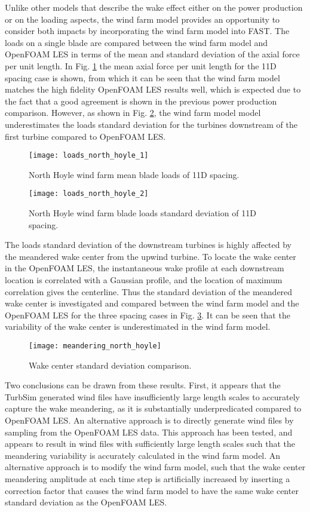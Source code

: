 \documentclass{umthesis}
\begin{document}
Unlike other models that describe the wake effect either on the power production or on the loading aspects, the wind farm model provides an opportunity to consider both impacts by incorporating the wind farm model into FAST. The loads on a single blade are compared between the wind farm model and OpenFOAM LES in terms of the mean and standard deviation of the axial force per unit length. In Fig. \ref{fig:loads_north_hoyle_1} the mean axial force per unit length for the 11D spacing case is shown, from which it can be seen that the wind farm model matches the high fidelity OpenFOAM LES results well, which is expected due to the fact that a good agreement is shown in the previous power production comparison. However, as shown in Fig. \ref{fig:loads_north_hoyle_2}, the wind farm model model underestimates the loads standard deviation for the turbines downstream of the first turbine compared to OpenFOAM LES.
\begin{figure}
  \centering
  \texttt{[image: loads\_north\_hoyle\_1]}
  \caption{North Hoyle wind farm mean blade loads of 11D spacing.}\label{fig:loads_north_hoyle_1}
\end{figure}

\begin{figure}
  \centering
  \texttt{[image: loads\_north\_hoyle\_2]}
  \caption{North Hoyle wind farm blade loads standard deviation of 11D spacing.}\label{fig:loads_north_hoyle_2}
\end{figure}

The loads standard deviation of the downstream turbines is highly affected by the meandered wake center from the upwind turbine. To locate the wake center in the OpenFOAM LES, the instantaneous wake profile at each downstream location is correlated with a Gaussian profile, and the location of maximum correlation gives the centerline. Thus the standard deviation of the meandered wake center is investigated and compared between the wind farm model and the OpenFOAM LES for the three spacing cases in Fig. \ref{fig:meandering_north_hoyle}. It can be seen that the variability of the wake center is underestimated in the wind farm model.
\begin{figure}
  \centering
  \texttt{[image: meandering\_north\_hoyle]}
  \caption{Wake center standard deviation comparison.}\label{fig:meandering_north_hoyle}
\end{figure}

Two conclusions can be drawn from these results. First, it appears that the TurbSim generated wind files have insufficiently large length scales to accurately capture the wake meandering, as it is substantially underpredicated compared to OpenFOAM LES. An alternative approach is to directly generate wind files by sampling from the OpenFOAM LES data. This approach has been tested, and appears to result in wind files with sufficiently large length scales such that the meandering variability is accurately calculated in the wind farm model. An alternative approach is to modify the wind farm model, such that the wake center meandering amplitude at each time step is artificially increased by inserting a correction factor that causes the wind farm model to have the same wake center standard deviation as the OpenFOAM LES.
\end{document}
